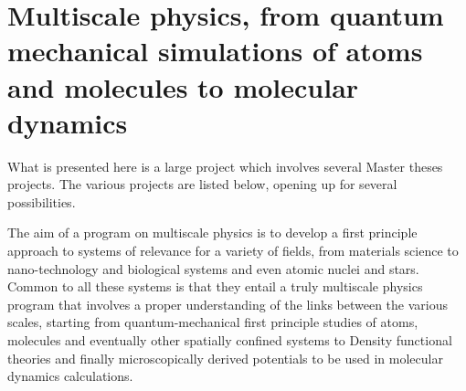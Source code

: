 \documentclass[10pt]{article}
\begin{document}
\section*{Multiscale physics, from quantum mechanical simulations of atoms and molecules to molecular dynamics}

What is presented here is a large project which involves several Master theses  projects. 
The various projects are listed below, opening up for several possibilities.

The aim of a program on multiscale physics is to develop a 
first principle approach to systems of relevance for a variety of fields, from materials science to nano-technology and biological systems and even
atomic nuclei  and stars. 
Common to all these systems is that they entail a truly multiscale physics program that involves a proper understanding of the links
between the various scales, starting 
from quantum-mechanical first principle studies of atoms, molecules and eventually other spatially confined 
systems to Density functional theories and finally microscopically derived potentials to be used in molecular dynamics calculations. 
\end{document}
